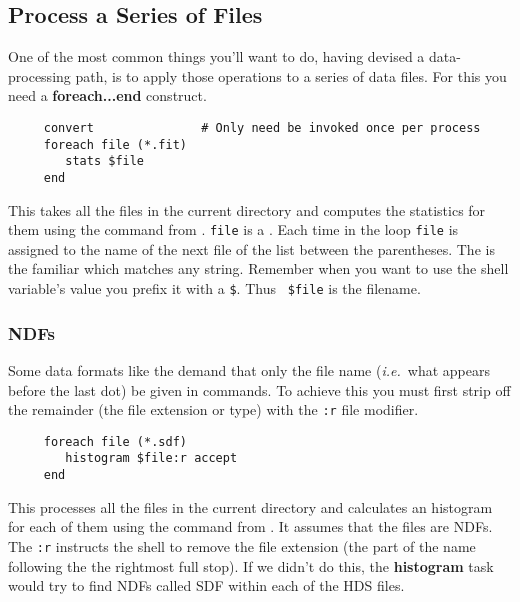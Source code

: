 \newpage
\subsection{Process a Series of Files
\label{sc4_se_series_files}}

One of the most common things you'll want to do, having devised
a data-processing path, is to apply those operations to a series
of data files.   For this you need a {\bf foreach...end} construct.

\small
\begin{verbatim}
     convert               # Only need be invoked once per process
     foreach file (*.fit)
        stats $file
     end
\end{verbatim}
\normalsize
This takes all the  files in the
current directory and computes the statistics for them using the
 command from \KAPPAref\normalsize\@.  {\tt file}
is a .  Each time in the
loop {\tt file} is assigned to the name of the next file of the list
between the parentheses.  The {\tt *} is the familiar 
 which
matches any string.  Remember when you want to use the shell
variable's value you prefix it with a {\tt \$}.  Thus {\tt
\$file} is the filename.

\subsubsection{NDFs\label{sc4_se_series_ndfs}}

Some data formats like the  demand that only the file
name ({\em i.e.}\ what appears before the last dot) be given in
commands.  To achieve this you must first strip off the remainder (the
file extension or type) with the {\tt :r} {\sf file modifier}.

\small
\begin{verbatim}
     foreach file (*.sdf)
        histogram $file:r accept
     end
\end{verbatim}
\normalsize

This processes all the {\sf \HDSref} files in the current directory
and calculates an histogram for each of them using the
 command from
\KAPPAref\normalsize\@.  It
assumes that the files are NDFs.  The {\tt :r}
instructs the shell to remove the file extension (the part of the name
following the the rightmost full stop).  If we didn't do this, the {\bf
histogram} task would try to find NDFs called SDF within each of the
HDS files.


